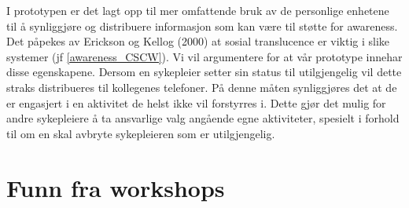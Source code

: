 \noindent
I prototypen er det lagt opp til mer omfattende bruk av de personlige enhetene til å synliggjøre og distribuere informasjon som kan være til støtte for awareness. Det påpekes av Erickson og Kellog (2000) at sosial translucence er viktig i slike systemer (jf \ref{awareness_CSCW}). Vi vil argumentere for at vår prototype innehar disse egenskapene.  Dersom en sykepleier setter sin status til utilgjengelig vil dette straks distribueres til kollegenes telefoner. På denne måten synliggjøres det at de er engasjert i en aktivitet de helst ikke vil forstyrres i. Dette gjør det mulig for andre sykepleiere å ta ansvarlige valg angående egne aktiviteter, spesielt i forhold til om en skal avbryte sykepleieren som er utilgjengelig. 


\section{Funn fra workshops}

